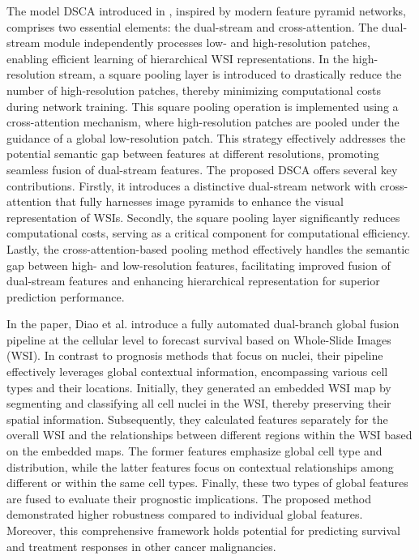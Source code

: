 \documentclass[journal,twoside,web]{ieeecolor}
\begin{document}
The model DSCA introduced in \cite{liu2023dsca}, inspired by modern feature pyramid networks\cite{wang2021pyramid}, comprises two essential elements: the dual-stream and cross-attention.
The dual-stream module independently processes low- and high-resolution patches, enabling efficient learning of hierarchical WSI representations. 
In the high-resolution stream, a square pooling layer is introduced to drastically reduce the number of high-resolution patches, thereby minimizing computational costs during network training. 
This square pooling operation is implemented using a cross-attention mechanism, where high-resolution patches are pooled under the guidance of a global low-resolution patch. 
This strategy effectively addresses the potential semantic gap between features at different resolutions, promoting seamless fusion of dual-stream features.
The proposed DSCA offers several key contributions. 
Firstly, it introduces a distinctive dual-stream network with cross-attention that fully harnesses image pyramids to enhance the visual representation of WSIs. 
Secondly, the square pooling layer significantly reduces computational costs, serving as a critical component for computational efficiency. 
Lastly, the cross-attention-based pooling method effectively handles the semantic gap between high- and low-resolution features, facilitating improved fusion of dual-stream features and enhancing hierarchical representation for superior prediction performance.

In the paper\cite{diao2023automated}, Diao et al. introduce a fully automated dual-branch global fusion pipeline at the cellular level to forecast survival based on Whole-Slide Images (WSI). 
In contrast to prognosis methods that focus on nuclei, their pipeline effectively leverages global contextual information, encompassing various cell types and their locations. 
Initially, they generated an embedded WSI map by segmenting and classifying all cell nuclei in the WSI, thereby preserving their spatial information. 
Subsequently, they calculated features separately for the overall WSI and the relationships between different regions within the WSI based on the embedded maps. 
The former features emphasize global cell type and distribution, while the latter features focus on contextual relationships among different or within the same cell types. 
Finally, these two types of global features are fused to evaluate their prognostic implications. 
The proposed method demonstrated higher robustness compared to individual global features. 
Moreover, this comprehensive framework holds potential for predicting survival and treatment responses in other cancer malignancies.
\end{document}
